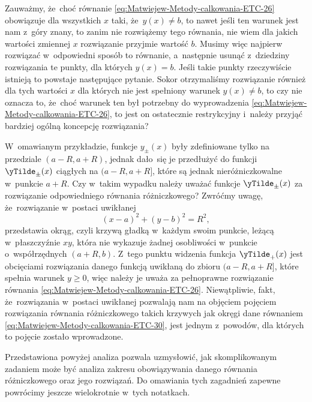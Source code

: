 \documentclass[a4paper,11pt]{article}
\numberwithin{equation}{section}
\begin{document}
Zauważmy, że~choć równanie \eqref{eq:Matwiejew-Metody-calkowania-ETC-26}
obowiązuje dla wszystkich $x$ taki, że~$y( x ) \neq b$, to nawet jeśli ten
warunek jest nam z~góry znany, to zanim nie rozwiążemy tego równania, nie
wiem dla jakich wartości zmiennej $x$ rozwiązanie przyjmie wartość $b$.
Musimy więc najpierw rozwiązać w~odpowiedni sposób to równanie, a~następnie
usunąć z~dziedziny rozwiązania te punkty, dla których $y( x ) = b$. Jeśli
takie punkty rzeczywiście istnieją to powstaje następujące pytanie. Sokor
otrzymaliśmy rozwiązanie również dla tych wartości $x$ dla
których nie jest spełniony warunek $y( x ) \neq b$, to czy nie oznacza to,
że~choć warunek ten był potrzebny do wyprowadzenia
\eqref{eq:Matwiejew-Metody-calkowania-ETC-26}, to jest on ostatecznie
restrykcyjny i~należy przyjąć bardziej ogólną koncepcję rozwiązania?

W~omawianym przykładzie, funkcje $y_{ \pm }( x )$ były zdefiniowane tylko na
przedziale $( a - R, a + R )$, jednak dało~się je przedłużyć do funkcji
$\yTilde_{ \pm }( x )$ ciągłych na $( a - R, a + R ]$, które są jednak
nieróżniczkowalne w~punkcie $a + R$. Czy w~takim wypadku należy uważać
funkcje $\yTilde_{ \pm }( x )$ za rozwiązanie odpowiedniego równania
różniczkowego? Zwróćmy uwagę, że~rozwiązanie w~postaci uwikłanej
\begin{equation}
  \label{eq:Uwagi-do-konkrentych-stron-09}
  ( x - a )^{ 2 } + ( y - b )^{ 2 } = R^{ 2 },
\end{equation}
przedstawia okrąg, czyli krzywą gładką w~każdym swoim punkcie, leżącą
w~płaszczyźnie $xy$, która nie wykazuje żadnej osobliwości w~punkcie
o~współrzędnych $( a + R, b )$. Z~tego
punktu widzenia funkcja $\yTilde_{ + }( x )$ jest obcięciami rozwiązania
danego funkcją uwikłaną do zbioru $( a - R, a + R ]$, które spełnia warunek
$y \geq 0$, więc należy je uważa za pełnoprawne rozwiązanie równania
\eqref{eq:Matwiejew-Metody-calkowania-ETC-26}. Niewątpliwie, fakt,
że~rozwiązania w~postaci uwikłanej pozwalają nam na objęciem pojęciem
rozwiązania równania różniczkowego takich krzywych jak okręgi dane równaniem
\eqref{eq:Matwiejew-Metody-calkowania-ETC-30}, jest jednym z~powodów, dla
których to pojęcie zostało wprowadzone.

Przedstawiona powyżej analiza pozwala uzmysłowić, jak skomplikowanym
zadaniem może być analiza zakresu obowiązywania danego równania
różniczkowego oraz jego rozwiązań. Do omawiania tych zagadnień zapewne
powrócimy jeszcze wielokrotnie w~tych notatkach.

\VerSpaceFour
\end{document}

